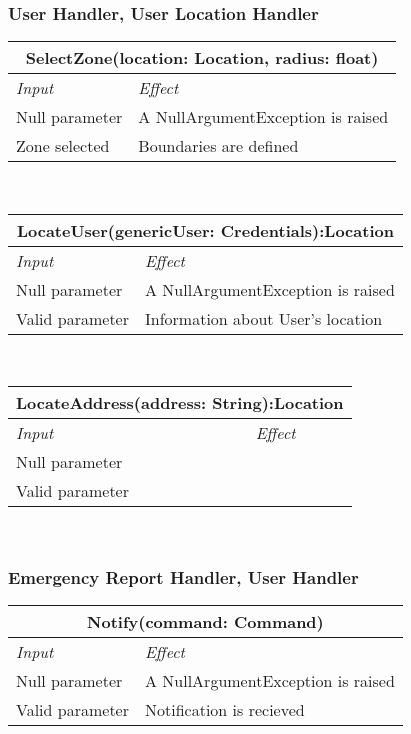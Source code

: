 			\subsubsection*{User Handler, User Location Handler}
			\begin{tabular}{ |l|l| }
				\hline
				\multicolumn{2}{|c|}{SelectZone(location: Location, radius: float)}\\
				\hline
				\textit{Input}&\textit{Effect}\\ \hline
				Null parameter & A NullArgumentException is raised\\ \hline
				Zone selected & Boundaries are defined \\ \hline
			\end{tabular}
			\\
			\begin{tabular}{ |l|l| }
				\hline
				\multicolumn{2}{|c|}{LocateUser(genericUser: Credentials):Location}\\
				\hline
				\textit{Input}&\textit{Effect}\\ \hline
				Null parameter & A NullArgumentException is raised\\ \hline
				Valid parameter  &  Information about User's location \\ \hline
			\end{tabular} 
			\\
			\begin{tabular}{ |l|l| } %
				\hline
				\multicolumn{2}{|c|}{LocateAddress(address: String):Location}\\
				\hline
				\textit{Input}&\textit{Effect}\\ \hline
				Null parameter & \\ \hline
				Valid parameter  &  \\ \hline
			\end{tabular}
			\\
			\subsubsection*{Emergency Report Handler, User Handler}
			\begin{tabular}{ |l|l| }
				\hline
				\multicolumn{2}{|c|}{Notify(command: Command)}\\
				\hline
				\textit{Input}&\textit{Effect}\\ \hline
				Null parameter & A NullArgumentException is raised\\ \hline
				Valid parameter & Notification is recieved \\ \hline
			\end{tabular}
			\\			
			

